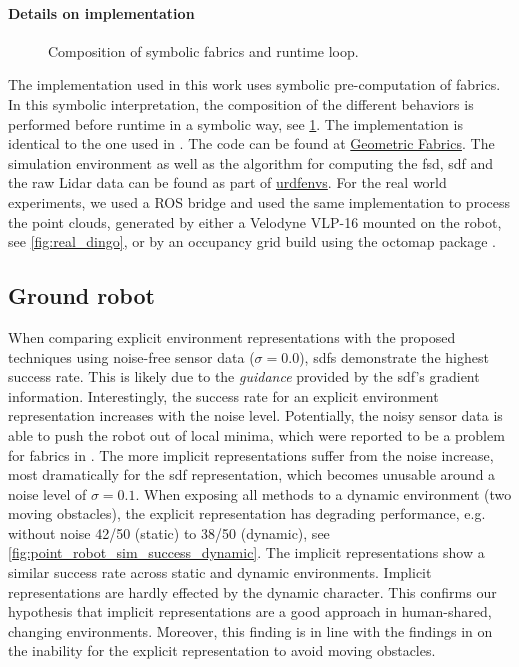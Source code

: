 \paragraph{Details on implementation}
%
\begin{figure}[ht]
  \centering
  
  \caption{Composition of symbolic \ac{fabrics} and runtime loop.}
  \label{fig:composition_symbolic_fabrics}
\end{figure}
%
The implementation used in this work uses symbolic
pre-computation of \ac{fabrics}. In this symbolic
interpretation, the composition of the different behaviors
is performed before runtime in a symbolic way, see
\cref{fig:composition_symbolic_fabrics}. The implementation
is identical to the one used
in \cite{spahn2023autotuning}. The code can be found at
\href{www.github.com/tud-amr/fabrics}{Geometric Fabrics}. The simulation
environment as well as the algorithm for computing the \ac{fsd}, \ac{sdf}
and the raw Lidar data can be found as part of
\href{www.github.com/maxspahn/gym_envs_urdf}{urdfenvs}. For the real world
experiments, we used a ROS bridge and used the same
implementation to process the point clouds, generated by
either a Velodyne VLP-16 mounted on the robot, see
\cref{fig:real_dingo}, or by an occupancy grid build using
the octomap package \cite{Hornung2013}.

\subsection{Ground robot}
\label{sub:point_robot}

When comparing explicit environment representations with the proposed techniques
using noise-free sensor data ($\sigma=0.0$), \acp{sdf} demonstrate the highest
success rate. This is likely due to the \textit{guidance} provided by the
\ac{sdf}'s gradient information. Interestingly, the success
rate for an explicit environment representation increases
with the noise level. Potentially, the noisy sensor data is
able to push the robot out of local minima, which were
reported to be a problem for \ac{fabrics} in
\cite{Spahn2023}. The more implicit representations suffer
from the noise increase, most dramatically for the
\ac{sdf} representation, which becomes unusable around a
noise level of $\sigma=0.1$. When exposing all methods to a
dynamic environment (two moving obstacles), the explicit
representation has degrading performance, e.g. without noise 42/50 (static) to
38/50 (dynamic), see
\cref{fig:point_robot_sim_success_dynamic}.
The implicit representations show a similar success rate
across static and dynamic environments.
Implicit
representations are hardly effected by the dynamic
character. This confirms our hypothesis that implicit
representations are a good approach in human-shared,
changing environments. Moreover, this finding is in line with the findings in
\cite{Spahn2023} on the inability for the explicit
representation to avoid moving obstacles.

